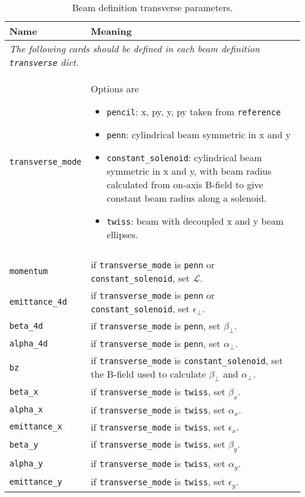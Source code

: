 \begin{table*}
\begin{center}
\caption{Beam definition transverse parameters.}
\begin{tabularx}{\linewidth}{lX}
Name & Meaning \\
\hline
\multicolumn{2}{|l|}{\emph{The following cards should be defined in each beam definition \verb|transverse| dict.}} \\
\hline
\verb|transverse_mode| & Options are
                          \begin{itemize}
                            \setlength{\itemsep}{0mm}
                            \item \verb|pencil|: x, py, y, py taken from \verb|reference|
                            \item \verb|penn|: cylindrical beam symmetric in x and y
                            \item \verb|constant_solenoid|: cylindrical beam symmetric in x and y, with beam radius calculated from on-axis B-field to give constant beam radius along a solenoid.
                            \item \verb|twiss|: beam with decoupled x and y beam ellipses.
                          \end{itemize} \\
\hline
\begin{tabular}{l}\verb|normalised_angular_| \\ \verb|momentum| \end{tabular} & if \verb|transverse_mode| is \verb|penn| or \verb|constant_solenoid|, set $\mathcal{L}$.\\
\verb|emittance_4d| & if \verb|transverse_mode| is \verb|penn| or \verb|constant_solenoid|, set $\epsilon_\perp$.\\
\verb|beta_4d| & if \verb|transverse_mode| is \verb|penn|, set $\beta_\perp$.\\
\verb|alpha_4d| & if \verb|transverse_mode| is \verb|penn|, set $\alpha_\perp$.\\
\verb|bz| & if \verb|transverse_mode| is \verb|constant_solenoid|, set the B-field used to calculate $\beta_\perp$ and $\alpha_\perp$.\\
\hline
\verb|beta_x| & if \verb|transverse_mode| is \verb|twiss|, set $\beta_x$.\\
\verb|alpha_x| & if \verb|transverse_mode| is \verb|twiss|, set $\alpha_x$.\\
\verb|emittance_x| & if \verb|transverse_mode| is \verb|twiss|, set $\epsilon_x$.\\
\verb|beta_y| & if \verb|transverse_mode| is \verb|twiss|, set $\beta_y$.\\
\verb|alpha_y| & if \verb|transverse_mode| is \verb|twiss|, set $\alpha_y$.\\
\verb|emittance_y| & if \verb|transverse_mode| is \verb|twiss|, set $\epsilon_y$.\\
\end{tabularx}
\end{center}
\end{table*}


